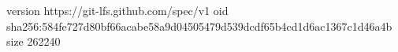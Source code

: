 version https://git-lfs.github.com/spec/v1
oid sha256:584fe727d80bf66acabe58a9d04505479d539dcdf65b4cd1d6ac1367c1d46a4b
size 262240
